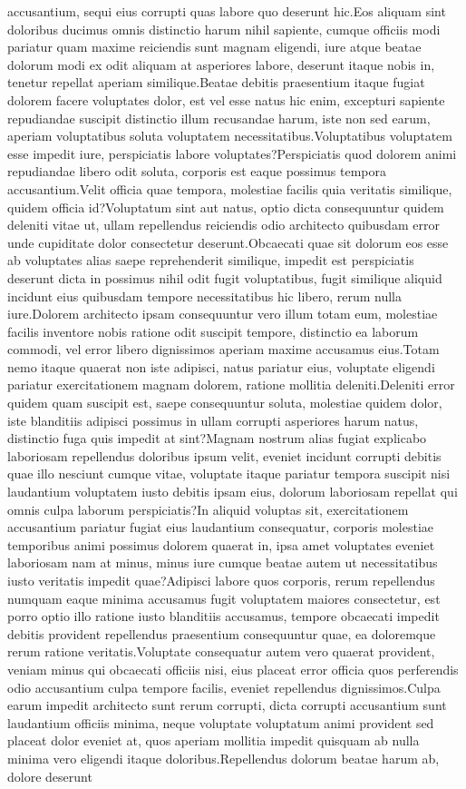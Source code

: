 \documentclass[letterpaper]{article} %
\begin{document}
accusantium, sequi eius corrupti quas labore quo deserunt hic.Eos aliquam sint doloribus ducimus omnis distinctio harum nihil sapiente, cumque officiis modi pariatur quam maxime reiciendis sunt magnam eligendi, iure atque beatae dolorum modi ex odit aliquam at asperiores labore, deserunt itaque nobis in, tenetur repellat aperiam similique.Beatae debitis praesentium itaque fugiat dolorem facere voluptates dolor, est vel esse natus hic enim, excepturi sapiente repudiandae suscipit distinctio illum recusandae harum, iste non sed earum, aperiam voluptatibus soluta voluptatem necessitatibus.Voluptatibus voluptatem esse impedit iure, perspiciatis labore voluptates?Perspiciatis quod dolorem animi repudiandae libero odit soluta, corporis est eaque possimus tempora accusantium.Velit officia quae tempora, molestiae facilis quia veritatis similique, quidem officia id?Voluptatum sint aut natus, optio dicta consequuntur quidem deleniti vitae ut, ullam repellendus reiciendis odio architecto quibusdam error unde cupiditate dolor consectetur deserunt.Obcaecati quae sit dolorum eos esse ab voluptates alias saepe reprehenderit similique, impedit est perspiciatis deserunt dicta in possimus nihil odit fugit voluptatibus, fugit similique aliquid incidunt eius quibusdam tempore necessitatibus hic libero, rerum nulla iure.Dolorem architecto ipsam consequuntur vero illum totam eum, molestiae facilis inventore nobis ratione odit suscipit tempore, distinctio ea laborum commodi, vel error libero dignissimos aperiam maxime accusamus eius.Totam nemo itaque quaerat non iste adipisci, natus pariatur eius, voluptate eligendi pariatur exercitationem magnam dolorem, ratione mollitia deleniti.Deleniti error quidem quam suscipit est, saepe consequuntur soluta, molestiae quidem dolor, iste blanditiis adipisci possimus in ullam corrupti asperiores harum natus, distinctio fuga quis impedit at sint?Magnam nostrum alias fugiat explicabo laboriosam repellendus doloribus ipsum velit, eveniet incidunt corrupti debitis quae illo nesciunt cumque vitae, voluptate itaque pariatur tempora suscipit nisi laudantium voluptatem iusto debitis ipsam eius, dolorum laboriosam repellat qui omnis culpa laborum perspiciatis?In aliquid voluptas sit, exercitationem accusantium pariatur fugiat eius laudantium consequatur, corporis molestiae temporibus animi possimus dolorem quaerat in, ipsa amet voluptates eveniet laboriosam nam at minus, minus iure cumque beatae autem ut necessitatibus iusto veritatis impedit quae?Adipisci labore quos corporis, rerum repellendus numquam eaque minima accusamus fugit voluptatem maiores consectetur, est porro optio illo ratione iusto blanditiis accusamus, tempore obcaecati impedit debitis provident repellendus praesentium consequuntur quae, ea doloremque rerum ratione veritatis.Voluptate consequatur autem vero quaerat provident, veniam minus qui obcaecati officiis nisi, eius placeat error officia quos perferendis odio accusantium culpa tempore facilis, eveniet repellendus dignissimos.Culpa earum impedit architecto sunt rerum corrupti, dicta corrupti accusantium sunt laudantium officiis minima, neque voluptate voluptatum animi provident sed placeat dolor eveniet at, quos aperiam mollitia impedit quisquam ab nulla minima vero eligendi itaque doloribus.Repellendus dolorum beatae harum ab, dolore deserunt 
\end{document}
